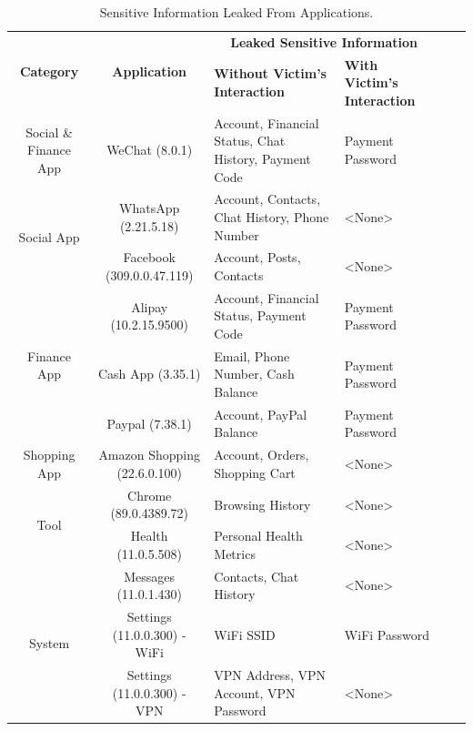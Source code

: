 \begin{table}[t]
	\centering
	\begin{tabular}{|c|c|l|l|c|c|}
		\hline
		\multirow{2}{*}{\textbf{Category} } & \multirow{2}{*}{ \textbf{Application} } & \multicolumn{2}{c|}{\textbf{Leaked Sensitive Information}} \\
															\cline{3-4}
											&				& \textbf{Without Victim's Interaction}						& \textbf{With Victim's Interaction} \\
		\hline
		Social \& Finance App 				& WeChat (8.0.1)      & Account, Financial Status, Chat History, Payment Code   		& Payment Password \\
		\hline
		\multirow{2}{*}{Social App}
							       			& WhatsApp (2.21.5.18)    & Account, Contacts, Chat History, Phone Number    & <None> \\
											\cline{2-4}
							       			& Facebook (309.0.0.47.119)   & Account, Posts, Contacts           & <None> \\
		\hline
		\multirow{3}{*}{Finance App}       	& Alipay (10.2.15.9500)      & Account, Financial Status, Payment Code         				& Payment Password \\
											\cline{2-4}
											& Cash App (3.35.1)   & Email, Phone Number, Cash Balance							& Payment Password \\
											\cline{2-4}
											& Paypal (7.38.1)      & Account, PayPal Balance     								& Payment Password \\
		\hline
		\multirow{1}{*}{Shopping App}		& Amazon Shopping (22.6.0.100)  & Account, Orders, Shopping Cart         				& <None> \\
		\hline
		\multirow{2}{*}{Tool}               & Chrome (89.0.4389.72)      & Browsing History                                	& <None> \\
											\cline{2-4}
		                					& Health (11.0.5.508)      & Personal Health Metrics      						& <None> \\
		\hline
		\multirow{3}{*}{System}             &  Messages (11.0.1.430)   & Contacts, Chat History				 &  <None> \\
											\cline{2-4}
											& Settings (11.0.0.300) - WiFi   & WiFi SSID                                	&  WiFi Password \\
											\cline{2-4}
		                					& Settings (11.0.0.300) - VPN    & VPN Address, VPN Account, VPN Password      						& <None> \\
		\hline
	\end{tabular}
	\linebreak
	\caption{Sensitive Information Leaked From Applications.}
	\label{table:information_extracted}
\end{table}


